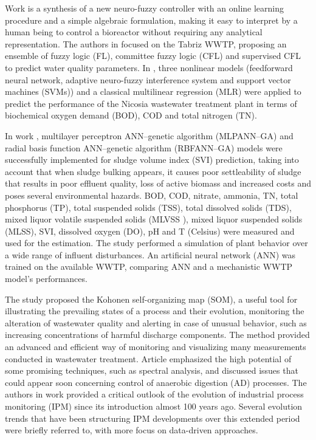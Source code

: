 Work \cite{Haggege2005} is a synthesis of a new neuro-fuzzy controller with an online learning procedure and a simple algebraic formulation, making it easy to interpret by a human being to control a bioreactor without requiring any analytical representation. The authors in \cite{Nadiri2018} focused on the Tabriz \ac{WWTP}, proposing an ensemble of fuzzy logic (FL), committee fuzzy logic (CFL)  and supervised CFL to predict water quality parameters. In \cite{Nourani2018}, three nonlinear models (feedforward neural network, adaptive neuro-fuzzy interference system and support vector machines (SVMs)) and a classical multilinear regression (MLR) were applied to predict the performance of the Nicosia wastewater treatment plant in terms of biochemical oxygen demand (BOD), COD and total nitrogen (TN). 

In work \cite{Bagheri2015}, multilayer perceptron ANN–genetic algorithm (MLPANN–GA) and radial basis function ANN–genetic algorithm (RBFANN–GA) models were successfully implemented for sludge volume index (SVI) prediction, taking into account that when sludge bulking appears, it causes poor settleability of sludge that results in poor effluent quality, loss of active biomass and increased costs and poses several environmental hazards. BOD, COD, nitrate, ammonia, TN, total phosphorus (TP), total suspended solids (TSS), total dissolved solids (TDS), mixed liquor volatile suspended solids (MLVSS ), mixed liquor suspended solids (MLSS), SVI, dissolved oxygen (DO), pH and T (Celsius) were measured and used for the estimation. The study \cite{Raduly2007} performed a simulation of plant behavior over a wide range of influent disturbances. An artificial neural network (ANN) was trained on the available WWTP, comparing ANN and a mechanistic WWTP model’s performances.

The study \cite{Liukkonen2013} proposed the Kohonen self-organizing map (SOM), a useful tool for illustrating the prevailing states of a process and their evolution, monitoring the alteration of wastewater quality and alerting in case of unusual behavior, such as increasing concentrations of harmful discharge components. The method provided an advanced and efficient way of monitoring and visualizing many measurements conducted in wastewater treatment. Article \cite{Jimenez2015} emphasized the high potential of some promising techniques, such as spectral analysis, and discussed issues that could appear soon concerning control of anaerobic digestion (AD) processes. The authors in work \cite{Reis2017} provided a critical outlook of the evolution of industrial process monitoring (IPM) since its introduction almost 100 years ago. Several evolution trends that have been structuring IPM developments over this extended period were briefly referred to, with more focus on data-driven approaches.

